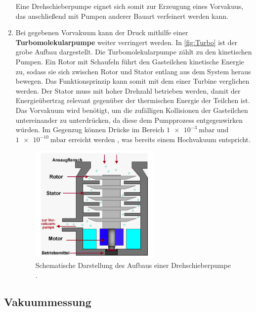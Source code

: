 \begin{enumerate}
    Eine Drehschieberpumpe eignet sich somit zur Erzeugung eines Vorvakuus, das anschließend mit Pumpen anderer Bauart verfeinert werden kann.
    \item Bei gegebenen Vorvakuum kann der Druck mithilfe einer \textbf{Turbomolekularpumpe} weiter verringert werden.
    In \autoref{fig:Turbo} ist der grobe Aufbau dargestellt.
    Die Turbomolekularpumpe zählt zu den kinetischen Pumpen. Ein Rotor mit Schaufeln führt den Gasteilchen kinetische Energie zu, sodass sie
    sich zwischen Rotor und Stator entlang aus dem System heraus bewegen. Das Funktionsprinzip kann somit mit dem einer Turbine verglichen werden. Der
    Stator muss mit hoher Drehzahl betrieben werden, damit der Energieübertrag relevant gegenüber der thermischen Energie der Teilchen ist.
    Das Vorvakuum wird benötigt, um die zufälligen Kollisionen der Gasteilchen untereinander zu unterdrücken, da diese dem Pumpprozess entgegenwirken
    würden. Im Gegenzug können Drücke im Bereich $\qty{1e-3}{\milli\bar}$ und $\qty{1e-10}{\milli\bar}$ erreicht werden \cite{Pfeiffer_Turbomolekularpumpen},
    was bereits einem Hochvakuum entspricht.
    \begin{figure}[H]
        \centering
        \includegraphics[width=0.6\textwidth]{content/pics/turbo.png}
        \caption{Schematische Darstellung des Aufbaus einer Drehschieberpumpe \cite{Turbopumpe}.}
        \label{fig:Turbo}
    \end{figure}
\end{enumerate}

\subsection{Vakuummessung}
